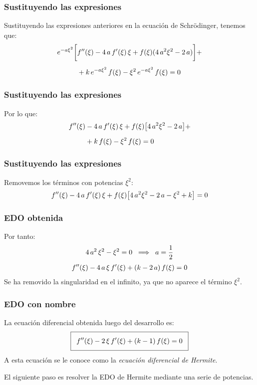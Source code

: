 \documentclass[12pt]{beamer}
\begin{document}
\begin{frame}
\frametitle{Sustituyendo las expresiones}
Sustituyendo las expresiones anteriores en la ecuación de Schrödinger, tenemos que:
\pause
\begin{align*}
e^{-a \xi^{2}} \bigg[ &{f}^{\prime \prime}(\xi) - 4 \, a \, {f}^{\prime}(\xi) \, \xi + f(\xi) (4 \, a^{2} \xi^{2} - 2 \, a) \bigg] + \\[0.5em]
&+ k \, e^{-a \xi^{2}} \, f(\xi) - \xi^{2} \, e^{-a \xi^{2}} \, f(\xi) = 0
\end{align*}
\end{frame}
\begin{frame}
\frametitle{Sustituyendo las expresiones}
Por lo que:
\pause
\begin{align*}
{f}^{\prime \prime}(\xi) &- 4 \, a \, {f}^{\prime}(\xi) \, \xi + f(\xi) \big[ 4 \, a^{2} \xi^{2} - 2 \, a \big] + \\[0.5em]
&+ k \, f(\xi) - \xi^{2} \, f(\xi) = 0
\end{align*}
\end{frame}
\begin{frame}
\frametitle{Sustituyendo las expresiones}
Removemos los términos con potencias $\xi^{2}$:
\pause
\begin{align*}
{f}^{\prime \prime}(\xi) - 4 \, a \, {f}^{\prime}(\xi) \, \xi + f(\xi) \big[ 4 \, a^{2} \xi^{2} - 2 \, a - \xi^{2} +  k \big] = 0
\end{align*}
\end{frame}
\begin{frame}
\frametitle{EDO obtenida}
Por tanto:
\pause
\begin{align*}
4 \, a^{2} \, \xi^{2} - \xi^{2} = 0 \hspace{0.2cm} \Longrightarrow \hspace{0.2cm} a = \dfrac{1}{2}
\end{align*}
\pause
\begin{align*}
{f}^{\prime \prime}(\xi) - 4 \, a \, \xi \, {f}^{\prime}(\xi) + (k - 2 \, a) \, f(\xi) = 0
\end{align*}    
Se ha removido la singularidad en el infinito, ya que no aparece el término $\xi^{2}$.
\end{frame}
\begin{frame}
\frametitle{EDO con nombre}
La ecuación diferencial obtenida luego del desarrollo es:
\pause
\begin{align*}
\addtolength{\fboxsep}{5pt}\boxed{
\stilde{f} (\xi) - 2 \, \xi \, \ptilde{f}(\xi) + (k - 1) \, f(\xi) = 0}
\end{align*}
A esta ecuación se le conoce como la \emph{ecuación diferencial de Hermite}.
\pause
\\
\par
El siguiente paso es resolver la EDO de Hermite mediante una serie de potencias.
\end{frame}
\end{document}
